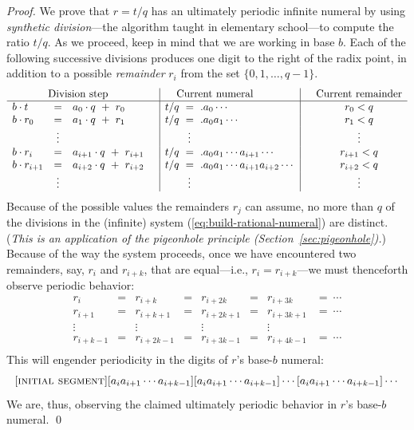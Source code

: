 \begin{proof}
We prove that $r = t/q$ has an ultimately periodic infinite numeral by
using  {\it synthetic division}---the
algorithm taught in elementary school---to compute the ratio $t/q$.
As we proceed, keep in mind that we are working in base $b$.  Each of
the following successive divisions produces one digit to the right of
the radix point, in addition to a possible {\it remainder} $r_i$ from
the set $\{0, 1, \ldots, q-1\}$.
\begin{equation}
\label{eq:build-rational-numeral}
\begin{array}{lclc|l|cc}
\multicolumn{3}{c}{\mbox{Division step}} & &  \hspace*{.15in} \mbox{Current numeral} & &
\mbox{Current remainder} \\
\hline
b \cdot t   & = & a_0 \cdot q \ + \ r_0 &
      & t/q \ = \ .a_0 \cdots &
      & r_0 < q \\
b \cdot r_0 & = & a_1 \cdot q \ + \ r_1 &
      & t/q \ = \ .a_0 a_1 \cdots &
      & r_1 < q \\
            & \vdots &  & & \hspace*{.3in} \vdots &  & \vdots \\
b \cdot r_i & = & a_{i+1} \cdot q \ + \ r_{i+1} &
      & t/q \ = \ .a_0 a_1 \cdots a_{i+1} \cdots &
      & r_{i+1} < q \\
b \cdot r_{i+1} & = & a_{i+2} \cdot q \ + \ r_{i+2} &
      & t/q \ = \ .a_0 a_1 \cdots a_{i+1} a_{i+2} \cdots &
      & r_{i+2} < q \\
            & \vdots &  & &  \hspace*{.3in}\vdots & & \vdots   \\
\end{array}
\end{equation}
Because of the possible values the remainders $r_j$ can assume, no
more than $q$ of the divisions in the (infinite) system
(\ref{eq:build-rational-numeral}) are distinct.  ({\em This is an
  application of the pigeonhole principle
  (Section~\ref{sec:pigeonhole}).})  Because of the way the system
proceeds, once we have encountered two remainders, say, $r_i$ and
$r_{i+k}$, that are equal---i.e., $r_i = r_{i+k}$---we must
thenceforth observe periodic behavior:
\[
\begin{array}{cccccccc}
r_i       & = & r_{i+k}    & = & r_{i+2k}   & = & r_{i+3k}   & = \ \cdots \\
r_{i+1}   & = & r_{i+k+1}  & = & r_{i+2k+1} & = & r_{i+3k+1} & = \ \cdots \\
\vdots    &   & \vdots     &   & \vdots     &   & \vdots     & \\
r_{i+k-1} & = & r_{i+2k-1} & = & r_{i+3k-1} & = & r_{i+4k-1} & = \ \cdots \\
\end{array}
\]
This will engender periodicity in the digits of $r$'s base-$b$ numeral:
\[ [\mbox{\sc initial segment}]
 [a_i a_{i+1} \cdots a_{i+k-1}]
          [a_i a_{i+1} \cdots a_{i+k-1}]
    \cdots  [a_i a_{i+1} \cdots a_{i+k-1}] \cdots 
\]
We are, thus, observing the claimed ultimately periodic behavior in
$r$'s base-$b$ numeral.
\qed
\end{proof}

